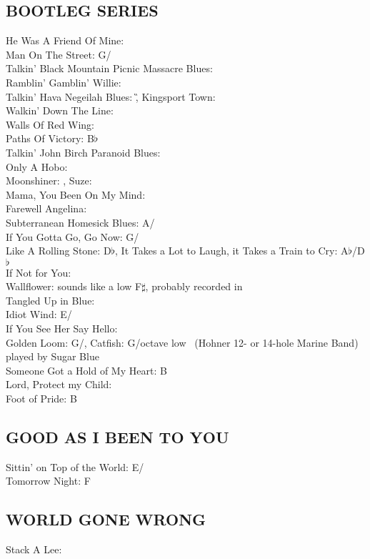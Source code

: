 \begin{articlelayout}
\subsection{BOOTLEG SERIES}
He Was A Friend Of Mine: \D\\ Man On The Street: G/\C\\ Talkin' Black Mountain Picnic Massacre Blues: \G\\ Ramblin' Gamblin' Willie: \C\\ Talkin' Hava Negeilah Blues: \G,
Kingsport Town: \C\\ Walkin' Down The Line: \G\\ Walls Of Red Wing: \G\\ Paths Of Victory: B$\flat$\\ Talkin' John Birch Paranoid Blues: \G\\ Only A Hobo: \G\\ Moonshiner: \E,
Suze: \E\\ Mama, You Been On My Mind: \E\\ Farewell Angelina: \G\\ Subterranean Homesick Blues: A/\D\\ If You Gotta Go, Go Now: G/\C\\ Like A Rolling Stone: D$\flat$,
It Takes a Lot to Laugh, it Takes a Train to Cry: A$\flat$/D$\flat$\\ If Not for You: \G\\ Wallflower: sounds like a low F$\sharp$,
probably recorded in \G\\ Tangled Up in Blue: \E\\ Idiot Wind: E/\A\\ If You See Her Say Hello: \E\\ Golden Loom: G/\C,
Catfish: G/octave low \C\ (Hohner 12- or 14-hole Marine Band) played by
Sugar Blue\\ Someone Got a Hold of My Heart: B\\ Lord, Protect my Child: \G\\ Foot of Pride: B


\subsection{GOOD AS I BEEN TO YOU}
Sittin' on Top of the World: E/\A\\ Tomorrow Night: F


\subsection{WORLD GONE WRONG}
Stack A Lee: \C



\end{articlelayout}

